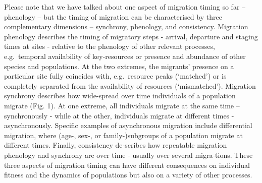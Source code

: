 \documentclass[
]{book}
\begin{document}
Please note that we have talked about one aspect of migration timing so far -- phenology -- but the timing of migration can be characterised by three complementary dimensions -- synchrony, phenology, and consistency. Migration phenology describes the timing of migratory steps - arrival, departure and staging times at sites - relative to the phenology of other relevant processes, e.g.~temporal availability of key-resources or presence and abundance of other species and populations. At the two extremes, the migrants' presence on a particular site fully coincides with, e.g.~resource peaks (`matched') or is completely separated from the availability of resources (`mismatched'). Migration synchrony describes how wide-spread over time individuals of a population migrate (Fig. 1). At one extreme, all individuals migrate at the same time -- synchronously - while at the other, individuals migrate at different times - asynchronously. Specific examples of asynchronous migration include differential migration, where (age-, sex-, or family-)subgroups of a population migrate at different times. Finally, consistency de-scribes how repeatable migration phenology and synchrony are over time - usually over several migra-tions.
These three aspects of migration timing can have different consequences on individual fitness and the dynamics of populations but also on a variety of other processes.
\end{document}
